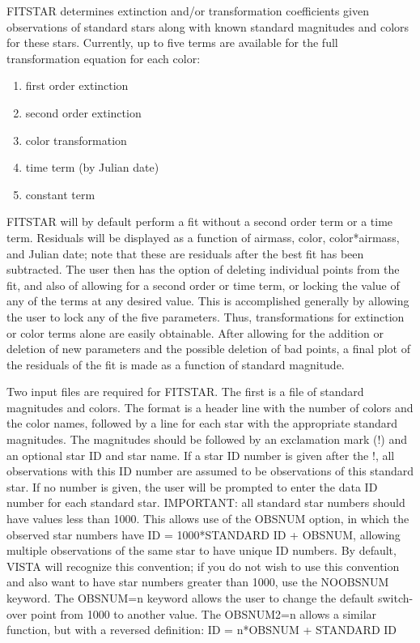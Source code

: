 FITSTAR determines extinction and/or transformation coefficients given
observations of standard stars along with known standard magnitudes and
colors for these stars. Currently, up to five terms are available for the
full transformation equation for each color: 

\begin{enumerate}
  \item{first order extinction}
  \item{second order extinction}
  \item{color transformation}
  \item{time term (by Julian date)}
  \item{constant term}
\end{enumerate}

FITSTAR will by default perform a fit without a second order term or a time
term. Residuals will be displayed as a function of airmass, color,
color*airmass, and Julian date; note that these are residuals after the
best fit has been subtracted. The user then has the option of deleting
individual points from the fit, and also of allowing for a second order or
time term, or locking the value of any of the terms at any desired
value. This is accomplished generally by allowing the user to lock any of
the five parameters. Thus, transformations for extinction or color terms
alone are easily obtainable. After allowing for the addition or deletion of
new parameters and the possible deletion of bad points, a final plot of the
residuals of the fit is made as a function of standard magnitude.

Two input files are required for FITSTAR. The first is a file of standard
magnitudes and colors. The format is a header line with the number of
colors and the color names, followed by a line for each star with the
appropriate standard magnitudes.  The magnitudes should be followed by an
exclamation mark (!)  and an optional star ID and star name. If a star ID
number is given after the !, all observations with this ID number are
assumed to be observations of this standard star. If no number is given,
the user will be prompted to enter the data ID number for each standard
star. IMPORTANT: all standard star numbers should have values less than
1000. This allows use of the OBSNUM option, in which the observed star
numbers have ID = 1000*STANDARD ID + OBSNUM, allowing multiple observations
of the same star to have unique ID numbers. By default, VISTA will
recognize this convention; if you do not wish to use this convention and
also want to have star numbers greater than 1000, use the NOOBSNUM
keyword. The OBSNUM=n keyword allows the user to change the default
switch-over point from 1000 to another value. The OBSNUM2=n allows a
similar function, but with a reversed definition: ID = n*OBSNUM + STANDARD
ID

